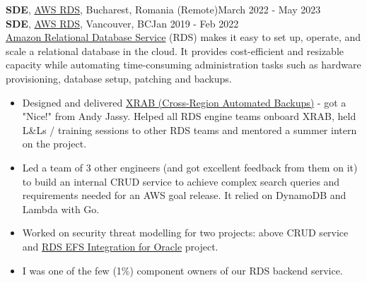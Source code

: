 \documentclass[line, margin]{resume}
\begin{document}
\begin{resume}
\textbf{SDE}, \href{https://aws.amazon.com/}{AWS RDS}, Bucharest, Romania (Remote)\hfill March 2022 - May 2023\\
\textbf{SDE}, \href{https://aws.amazon.com/}{AWS RDS}, Vancouver, BC\hfill Jan 2019 - Feb 2022 \\
\href{https://aws.amazon.com/rds/}{Amazon Relational Database Service} (RDS) makes it easy to set up, operate, and scale a relational database in the cloud. It provides cost-efficient and resizable capacity while automating time-consuming administration tasks such as hardware provisioning, database setup, patching and backups.
\begin{itemize} \itemsep -2pt  %
    \item Designed and delivered \href{https://docs.aws.amazon.com/AmazonRDS/latest/UserGuide/USER_ReplicateBackups.html}{XRAB (Cross-Region Automated Backups)} - got a "Nice!" from Andy Jassy. Helped all RDS engine teams onboard XRAB, held L\&Ls / training sessions to other RDS teams and mentored a summer intern on the project.
    \item Led a team of 3 other engineers (and got excellent feedback from them on it) to build an internal CRUD service to achieve complex search queries and requirements needed for an AWS goal release. It relied on DynamoDB and Lambda with Go.
    \item Worked on security threat modelling for two projects: above CRUD service and \href{https://docs.aws.amazon.com/AmazonRDS/latest/UserGuide/oracle-efs-integration.html}{RDS EFS Integration for Oracle} project.
    \item I was one of the few (1\%) component owners of our RDS backend service. %
\end{itemize}



\end{resume}
\end{document}

